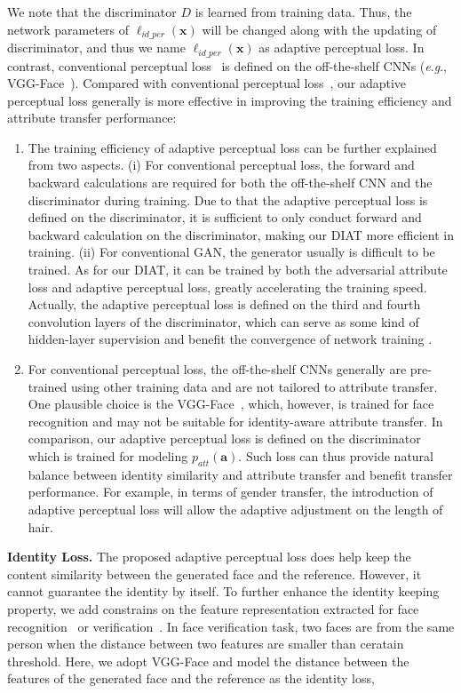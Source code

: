\documentclass[journal]{IEEEtran}
\newcommand{\eg}{\textit{e}.\textit{g}.}
\begin{document}
We note that the discriminator $D$ is learned from training data.
Thus, the network parameters of $\ell_{id\_per}(\mathbf{x})$ will be changed along with the updating of discriminator, and thus we name $\ell_{id\_per}(\mathbf{x})$ as adaptive perceptual loss.
In contrast, conventional perceptual loss~\cite{johnson2016perceptual} is defined on the off-the-shelf CNNs (\eg, VGG-Face~\cite{Parkhi15}).
Compared with conventional perceptual loss~\cite{johnson2016perceptual}, our adaptive perceptual loss generally is more effective in improving the training efficiency and attribute transfer performance:
\begin{enumerate}
\item The training efficiency of adaptive perceptual loss can be further explained from two aspects.
(i) For conventional perceptual loss, the forward and backward calculations are required for both the off-the-shelf CNN and the discriminator during training.
Due to that the adaptive perceptual loss is defined on the discriminator, it is sufficient to only conduct forward and backward calculation on the discriminator, making our DIAT more efficient in training.
(ii) For conventional GAN, the generator usually is difficult to be trained.
As for our DIAT, it can be trained by both the adversarial attribute loss and adaptive perceptual loss, greatly accelerating the training speed.
Actually, the adaptive perceptual loss is defined on the third and fourth convolution layers of the discriminator, which can serve as some kind of hidden-layer supervision and benefit the convergence of network training \cite{lee2015deeply}.
\item For conventional perceptual loss, the off-the-shelf CNNs generally are pre-trained using other training data and are not tailored to attribute transfer.
One plausible choice is the VGG-Face~\cite{Parkhi15}, which, however, is trained for face recognition and may not be suitable for identity-aware attribute transfer.
In comparison, our adaptive perceptual loss is defined on the discriminator which is trained for modeling $p_{att}(\mathbf{a})$.
Such loss can thus provide natural balance between identity similarity and attribute transfer and benefit transfer performance.
For example, in terms of gender transfer, the introduction of adaptive perceptual loss will allow the adaptive adjustment on the length of hair.

\end{enumerate}

\textbf{Identity Loss.}\quad
The proposed adaptive perceptual loss does help keep the content similarity between the generated face and the reference. However, it cannot guarantee the identity by itself. To further enhance the identity keeping property, we add constrains on the feature representation extracted for face recognition~\cite{huo2018heterogeneous} or verification~\cite{zheng2018pairwise}. In face verification task, two faces are from the same person when the distance between two features are smaller than ceratain threshold. Here, we adopt VGG-Face and model the distance between the features of the generated face and the reference as the identity loss,
\end{document}
